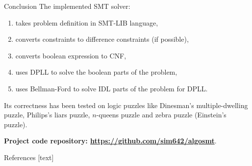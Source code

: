 \documentclass{beamer}
\begin{document}
\begin{frame}[fragile,t]
\begin{columns}[t,onlytextwidth]
\begin{column}{0.485\textwidth}
		\begin{block}{Conclusion}
			The implemented SMT solver:
			\begin{enumerate}
				\item takes problem definition in SMT-LIB language,
				\item converts constraints to difference constraints (if possible),
				\item converts boolean expression to CNF,
				\item uses DPLL to solve the boolean parts of the problem,
				\item uses Bellman-Ford to solve IDL parts of the problem for DPLL.
			\end{enumerate}

			Its correctness has been tested on logic puzzles like Dinesman's multiple-dwelling puzzle, Philips's liars puzzle, $n$-queens puzzle and zebra puzzle (Einstein's puzzle).

			\textbf{Project code repository: \url{https://github.com/sim642/algosmt}}.
		\end{block}
	
		\begin{block}{References}
			[text]
			\printbibliography[heading=none]
		\end{block}
	\end{column}
\end{columns}

%

\end{frame}
\end{document}
